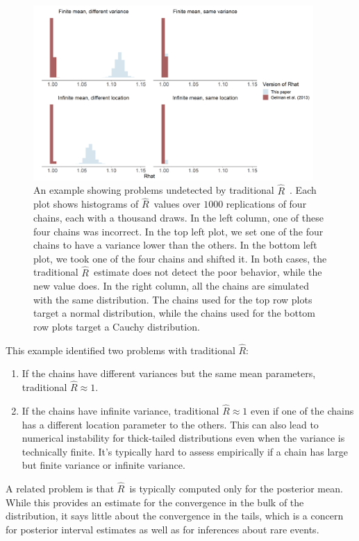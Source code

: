 \documentclass[american,]{article}
\newcommand{\Rhat}{$\widehat{R}$}
\theoremstyle{definition}
\begin{document}
\begin{figure}
\centering
\includegraphics[width=0.95\textwidth]{graphics/simple_rhat_compare.png}
\caption{An example showing problems undetected by
traditional \Rhat\ . Each plot shows
histograms of \Rhat\ values over $1000$ replications of four chains, each
with a thousand draws. In the left column, one of these four chains was 
incorrect. In the top left plot, we set one of the four chains to have a variance lower than the others.
In the bottom left plot, we took one of the four chains and shifted it.
In both cases, the traditional \Rhat\ estimate does not detect the poor
behavior, while the new value does. In the right column, all the chains are
simulated with the same distribution. The chains used for the top row plots target 
a normal distribution, while the chains used for the bottom row plots target
a Cauchy distribution. \label{fig:simple_example}}
\end{figure}

This example identified two problems with traditional \Rhat : 
\begin{enumerate}
\item If the chains have different variances but the same mean parameters, traditional $\widehat{R} \approx 1$.
\item If the chains have infinite variance, traditional $\widehat{R} \approx 1$ even if one of the chains has a different location parameter to the others. This can also lead to numerical instability for thick-tailed distributions even when the variance is technically finite. It's typically hard to assess empirically
if a chain has large but finite variance or infinite variance.
\end{enumerate}

A related problem is that \Rhat\ is
typically computed only for the posterior mean. While this provides an estimate 
for the convergence in the bulk of the distribution, it says little about the 
convergence in the tails, which is a concern for posterior 
interval estimates as well as for inferences about rare events.
 
\end{document}
